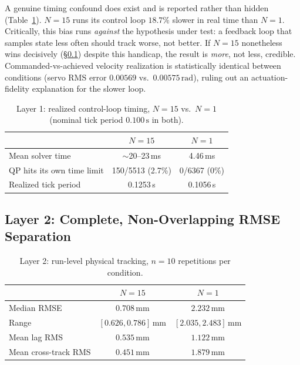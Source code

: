 \documentclass[journal]{IEEEtran}
\begin{document}
A genuine timing confound does exist and is reported rather than
hidden (Table~\ref{tab:timing}). $N{=}15$ runs its control loop
$18.7\%$ slower in real time than $N{=}1$. Critically, this bias runs
\emph{against} the hypothesis under test: a feedback loop that samples
state less often should track worse, not better. If $N{=}15$
nonetheless wins decisively (\S\ref{sec:ph-layer2}) despite this
handicap, the result is \emph{more}, not less, credible.
Commanded-vs-achieved velocity realization is statistically identical
between conditions (servo RMS error $0.00569$ vs.\
$0.00575\,\mathrm{rad}$), ruling out an actuation-fidelity explanation
for the slower loop.

\begin{table}[t]
\centering
\caption{Layer 1: realized control-loop timing, $N{=}15$ vs.\ $N{=}1$ (nominal tick period $0.100\,\mathrm{s}$ in both).}
\label{tab:timing}
\begin{tabular}{@{}lcc@{}}
\toprule
 & $N{=}15$ & $N{=}1$ \\
\midrule
Mean solver time & $\sim$20--23\,ms & 4.46\,ms \\
QP hits its own time limit & 150/5513 (2.7\%) & 0/6367 (0\%) \\
Realized tick period & 0.1253\,s & 0.1056\,s \\
\bottomrule
\end{tabular}
\end{table}

\subsection{Layer 2: Complete, Non-Overlapping RMSE Separation}
\label{sec:ph-layer2}

\begin{table}[t]
\centering
\caption{Layer 2: run-level physical tracking, $n{=}10$ repetitions per condition.}
\label{tab:rmse}
\begin{tabular}{@{}lcc@{}}
\toprule
 & $N{=}15$ & $N{=}1$ \\
\midrule
Median RMSE & $0.708\,\mathrm{mm}$ & $2.232\,\mathrm{mm}$ \\
Range & $[0.626,0.786]\,\mathrm{mm}$ & $[2.035,2.483]\,\mathrm{mm}$ \\
Mean lag RMS & $0.535\,\mathrm{mm}$ & $1.122\,\mathrm{mm}$ \\
Mean cross-track RMS & $0.451\,\mathrm{mm}$ & $1.879\,\mathrm{mm}$ \\
\bottomrule
\end{tabular}
\end{table}
\end{document}
